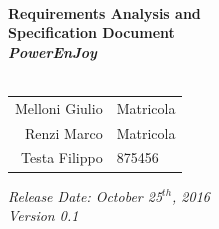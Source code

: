 \documentclass[11pt,a4paper]{report}
\begin{document}
\begin{titlepage}

\HRule \\[0.4cm]
{ \huge \bfseries Requirements Analysis and\\Specification Document\\[0.5cm]\textit{PowerEnJoy}}\\[0.4cm] %
\HRule \\[1.5cm]
 

\LARGE{
\begin{center}
\begin{tabular}{ r  l }
	Melloni Giulio & Matricola \\
	Renzi Marco & Matricola \\
	Testa Filippo & 875456 \\
\end{tabular}
\end{center}
}

 \vspace*{0.8cm}
{\LARGE {\it Release Date: October 25$^{th}$, 2016\\Version 0.1}}

\end{titlepage}
\end{document}
